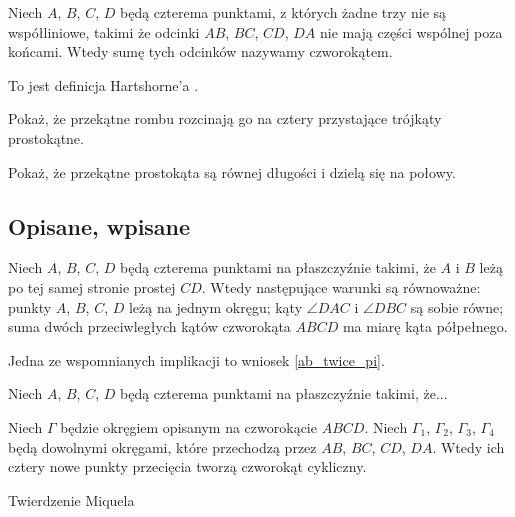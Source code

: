 %

\begin{definition}[czworokąt]
    Niech $A$, $B$, $C$, $D$ będą czterema punktami, z których żadne trzy nie są współliniowe, takimi że odcinki $AB$, $BC$, $CD$, $DA$ nie mają części wspólnej poza końcami.
    Wtedy sumę tych odcinków nazywamy czworokątem.
\end{definition}


To jest definicja Hartshorne'a \cite[s. 80]{hartshorne2000}.

Pokaż, że przekątne rombu rozcinają go na cztery przystające trójkąty prostokątne. %

Pokaż, że przekątne prostokąta są równej długości i dzielą się na połowy. %

\subsection{Opisane, wpisane}
\begin{proposition}
	\label{prp_incircle}
	Niech $A$, $B$, $C$, $D$ będą czterema punktami na płaszczyźnie takimi, że $A$ i $B$ leżą po tej samej stronie prostej $CD$.
	Wtedy następujące warunki są równoważne: punkty $A$, $B$, $C$, $D$ leżą na jednym okręgu; kąty $\angle DAC$ i $\angle DBC$ są sobie równe; suma dwóch przeciwległych kątów czworokąta $ABCD$ ma miarę kąta półpełnego.
\end{proposition}

Jedna ze wspomnianych implikacji to wniosek \ref{ab_twice_pi}.

\begin{proposition}
	\label{prp_excircle}
	Niech $A$, $B$, $C$, $D$ będą czterema punktami na płaszczyźnie takimi, że...
\end{proposition}

\begin{proposition}
	Niech $\Gamma$ będzie okręgiem opisanym na czworokącie $ABCD$.
	Niech $\Gamma_1$, $\Gamma_2$, $\Gamma_3$, $\Gamma_4$ będą dowolnymi okręgami, które przechodzą przez $AB$, $BC$, $CD$, $DA$.
	Wtedy ich cztery nowe punkty przecięcia tworzą czworokąt cykliczny.
\end{proposition}

Twierdzenie Miquela
\loremipsum
{} %


